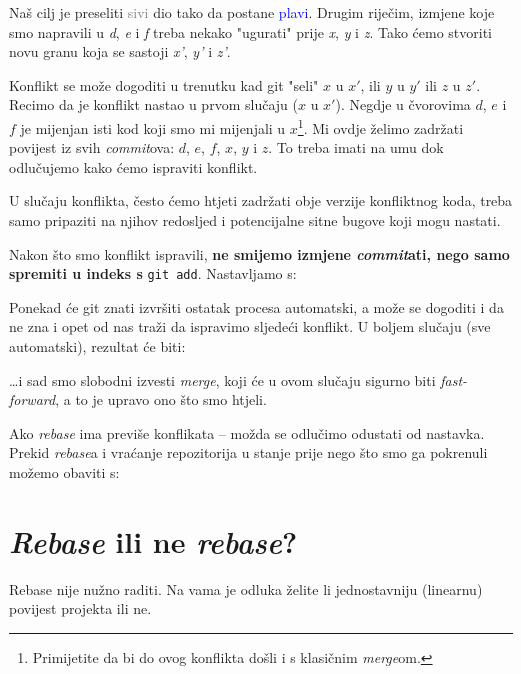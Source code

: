 

Naš cilj je preseliti \textcolor{gray}{sivi} dio tako da postane \textcolor{blue}{plavi}.
Drugim riječim, izmjene koje smo napravili u \emph d, \emph e i \emph f treba nekako "ugurati" prije \emph x, \emph y i \emph z.
Tako ćemo stvoriti novu granu koja se sastoji \emph{x'}, \emph{y'} i \emph{z'}.

Konflikt se može dogoditi u trenutku kad git "seli" $x$ u $x'$, ili $y$ u $y'$ ili $z$ u $z'$.
Recimo da je konflikt nastao u prvom slučaju ($x$ u $x'$).
Negdje u čvorovima $d$, $e$ i $f$ je mijenjan isti kod koji smo mi mijenjali u $x$\footnote{Primijetite da bi do ovog konflikta došli i s klasičnim \emph{merge}om.}.
Mi ovdje želimo zadržati povijest iz svih \emph{commit}ova: $d$, $e$, $f$, $x$, $y$ i $z$.
To treba imati na umu dok odlučujemo kako ćemo ispraviti konflikt.

U slučaju konflikta, često ćemo htjeti zadržati obje verzije konfliktnog koda, treba samo pripaziti na njihov redosljed i potencijalne sitne bugove koji mogu nastati.

Nakon što smo konflikt ispravili, \textbf{ne smijemo izmjene \emph{commit}ati, nego samo spremiti u indeks s} \verb+git add+.
Nastavljamo s:


Ponekad će git znati izvršiti ostatak procesa automatski, a može se dogoditi i da ne zna i opet od nas traži da ispravimo sljedeći konflikt.
U boljem slučaju (sve automatski), rezultat će biti:



\dots{}i sad smo slobodni izvesti \emph{merge}, koji će u ovom slučaju sigurno biti \emph{fast-forward}, a to je upravo ono što smo htjeli.

Ako \emph{rebase} ima previše konflikata -- možda se odlučimo odustati od nastavka.
Prekid \emph{rebase}a i vraćanje repozitorija u stanje prije nego što smo ga pokrenuli možemo obaviti s:


\section*{\emph{Rebase} ili ne \emph{rebase}?}

Rebase nije nužno raditi.
Na vama je odluka želite li jednostavniju (linearnu) povijest projekta ili ne.

